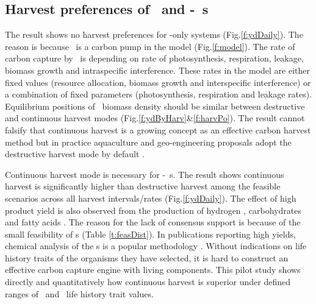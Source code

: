 \documentclass[../thesis.tex]{subfiles} %
\begin{document}
\subsection{Harvest preferences of \phy\ and \phy-\bac\ \pbs s}
The result shows no harvest preferences for \phy-only systems (Fig.\ref{f:ydDaily}).  The reason is because \phy\ is a carbon pump in the model (Fig.\ref{f:model}).  The rate of carbon capture by \phy\ is depending on rate of photosynthesis, respiration, leakage, biomass growth and intraspecific interference.  These rates in the model are either fixed values (resource allocation, biomass growth and interspecific interference) or a combination of fixed parameters (photosynthesis, respiration and leakage rates).  Equilibrium positions of \phy\ biomass density should be similar between destructive and continuous harvest modes (Fig.\ref{f:ydByHarv}\&\ref{f:harvPo}).  The result cannot falsify that continuous harvest is a growing concept as an effective carbon harvest method \autocite{fuentes2016impact} but in practice aquaculture and geo-engineering proposals adopt the destructive harvest mode by default \autocite{lawrence2014efficiency,krause2016substantial}.

Continuous harvest mode is necessary for \phy-\bac\ \pbs s.  The result shows continuous harvest is significantly higher than destructive harvest among the feasible scenarios across all harvest intervals/rates (Fig.\ref{f:ydDaily}).  The effect of high product yield is also observed from the production of hydrogen \autocite{kim2008anaerobic}, carbohydrates \autocite{choix2012enhanced1,choix2012enhanced2} and fatty acids \autocite{leyva2014accumulation}.  The reason for the lack of consensus support is because of the small feasibility of \pbs s (Table \ref{t:feasDist}).  In publications reporting high yields, chemical analysis of the \pbs s is a popular methodology \autocite{santos2014microalgal,rivas2010interactions,leyva2014accumulation,amin2009photolysis}.  Without indications on life history traits of the organisms they have selected, it is hard to construct an effective carbon capture engine with living components.  This pilot study shows directly and quantitatively how continuous harvest is superior under defined ranges of \phy\ and \bac\ life history trait values.
\end{document}
